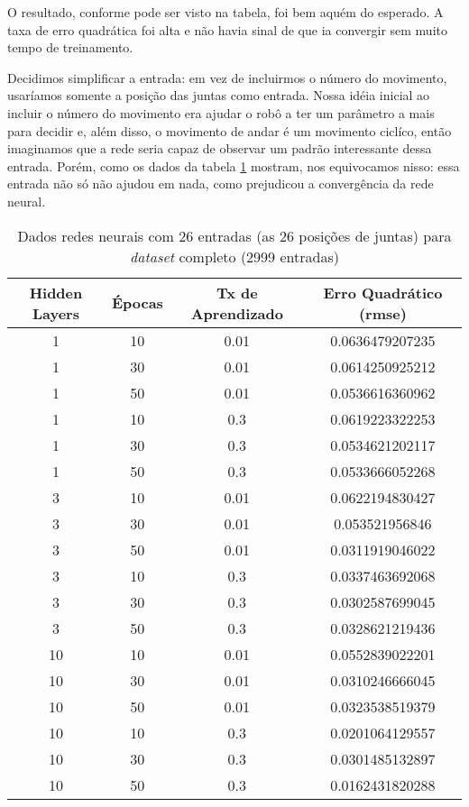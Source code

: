 \documentclass[twoside,conference,a4paper]{IEEEtran}
\begin{document}
 O resultado, conforme pode ser visto na tabela, foi bem aquém do esperado. A taxa de erro quadrática foi alta e não havia sinal de que ia convergir sem muito tempo de treinamento.

Decidimos simplificar a entrada: em vez de incluirmos o número do movimento, usaríamos somente a posição das juntas como entrada. Nossa idéia inicial ao incluir o número do movimento era ajudar o robô a ter um parâmetro a mais para decidir e, além disso, o movimento de andar é um movimento ciclíco, então imaginamos que a rede seria capaz de observar um padrão interessante dessa entrada. Porém, como os dados da tabela \ref{redes_neurais_tabela_2} mostram, nos equivocamos nisso: essa entrada não só não ajudou em nada, como prejudicou a convergência da rede neural.

 \begin{table}[h]
\caption{Dados redes neurais com 26 entradas (as 26 posições de juntas) para \textsl{dataset} completo (2999 entradas)}
 \label{redes_neurais_tabela_2}
 \begin{center}
 \begin{tabular}{|c|c|c|c|}
 \hline
 Hidden Layers & Épocas & Tx de Aprendizado & Erro Quadrático (rmse) \\
 \hline
 1 & 10 & 0.01 & 0.0636479207235 \\
 1 & 30 & 0.01 & 0.0614250925212 \\
 1 & 50 & 0.01 & 0.0536616360962 \\
 1 & 10 & 0.3 & 0.0619223322253 \\
 1 & 30 & 0.3 & 0.0534621202117 \\
 1 & 50 & 0.3 & 0.0533666052268 \\
 3 & 10 &  0.01 & 0.0622194830427\\
 3 &  30 & 0.01 & 0.053521956846 \\
 3 &  50 & 0.01 & 0.0311919046022\\
 3 & 10 &  0.3 & 0.0337463692068 \\
 3 &  30 & 0.3 & 0.0302587699045 \\
 3 &  50 & 0.3 &  0.0328621219436\\
 10 & 10 & 0.01 &  0.0552839022201 \\
10 &  30 & 0.01 & 0.0310246666045 \\
10 &  50 & 0.01 & 0.0323538519379 \\
10 & 10 & 0.3  &  0.0201064129557 \\
10 &  30 & 0.3 & 0.0301485132897 \\
10 &  50 & 0.3 & 0.0162431820288 \\
 \hline
 \end{tabular}
 \end{center}
 \end{table}
\end{document}
